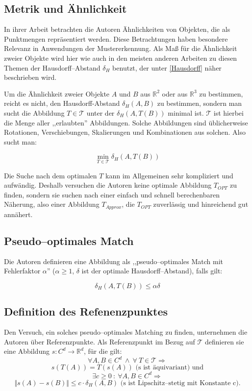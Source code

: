 \subsection{Metrik und Ähnlichkeit}

In ihrer Arbeit betrachten die Autoren Ähnlichkeiten von Objekten, die als Punktmengen repräsentiert werden. Diese Betrachtungen haben besondere Relevanz in Anwendungen der Mustererkennung. Als Maß für die Ähnlichkeit zweier Objekte wird hier wie auch in den meisten anderen Arbeiten zu diesen Themen der Hausdorff--Abstand $\delta_H$ benutzt, der unter \vref{Hausdorff} näher beschrieben wird.

Um die Ähnlichkeit  zweier Objekte $A$ und $B$ aus $\mathbb{R}^2$ oder aus $\mathbb{R}^3$ zu bestimmen, reicht es nicht, den Hausdorff-Abstand $\delta_H(A,B)$ zu bestimmen, sondern man sucht die Abbildung $T\in\mathcal{T}$ unter der $\delta_H(A,T(B))$ minimal ist. $\mathcal{T}$ ist hierbei die Menge aller ,,erlaubten'' Abbildungen. Solche Abbildungen sind üblicherweise Rotationen, Verschiebungen, Skalierungen und Kombinationen aus solchen. Also sucht man:

$$\min_{T\in\mathcal{T}}\delta_H(A,T(B))$$

Die Suche nach dem optimalen $T$ kann im Allgemeinen sehr kompliziert und aufwändig. Deshalb versuchen die Autoren keine optimale Abbildung $T_{OPT}$ zu finden, sondern sie suchen nach einer einfach und schnell berechenbaren Näherung, also einer Abbildung $T_{Approx}$, die $T_{OPT}$ zuverlässig und hinreichend gut annähert.

\subsection{Pseudo--optimales Match}

Die Autoren definieren eine Abbildung als ,,pseudo--optimales Match mit Fehlerfaktor $\alpha$''  ($\alpha\geq 1$, $\delta$ ist der optimale Hausdorff--Abstand), falls gilt:

$$\delta_H(A,T(B))\leq \alpha \delta$$

\subsection{Definition des Refenenzpunktes}

Den Versuch, ein solches pseudo--optimales Matching zu finden, unternehmen die Autoren über Referenzpunkte. Als Referenzpunkt im Bezug auf $\mathcal{T}$ definieren sie eine Abbildung $s:C^d\longrightarrow\mathbb{R}^d$, für die gilt:
$$\forall A, B\in C^d  \:\wedge\: \forall\: T\in\mathcal{T}\Rightarrow$$
$$s(T(A))=T(s(A))\text{ (s ist äquivariant) und}$$
$$\exists c\geq0 \: :\: \forall A, B \in C^d\Rightarrow$$
$$\Vert s(A)-s(B)\Vert\leq c\cdot\delta_H(A,B)\text{ (s ist Lipschitz--stetig mit Konstante c)}.$$

